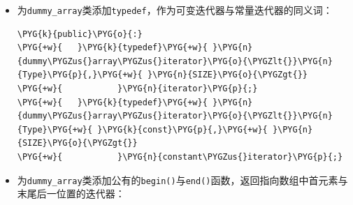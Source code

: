 \begin{itemize}
\begin{codeblockbg}
\begin{Verbatim}[commandchars=\\\{\},breaklines=true,breakanywhere=true,fontsize=\codefont,xleftmargin=17bp]
\PYG{p}{\PYGZob{}}
\PYG{+w}{  }\PYG{k}{return}\PYG{+w}{ }\PYG{p}{(}\PYG{o}{*}\PYG{p}{(}\PYG{o}{*}\PYG{k}{this}\PYG{+w}{ }\PYG{o}{+}\PYG{+w}{ }\PYG{n}{offset}\PYG{p}{)}\PYG{p}{)}\PYG{p}{;}
\PYG{p}{\PYGZcb{}}
\PYG{n}{value\PYGZus{}type}\PYG{+w}{ }\PYG{k}{const}\PYG{+w}{ }\PYG{o}{\PYGZam{}}\PYG{+w}{ }\PYG{k}{operator}\PYG{p}{[}\PYG{p}{]}\PYG{p}{(}\PYG{n}{difference\PYGZus{}type}\PYG{+w}{ }\PYG{k}{const}\PYG{+w}{ }\PYG{n}{offset}\PYG{p}{)}\PYG{+w}{ }\PYG{k}{const}
\PYG{p}{\PYGZob{}}
\PYG{+w}{  }\PYG{k}{return}\PYG{+w}{ }\PYG{p}{(}\PYG{o}{*}\PYG{p}{(}\PYG{o}{*}\PYG{k}{this}\PYG{+w}{ }\PYG{o}{+}\PYG{+w}{ }\PYG{n}{offset}\PYG{p}{)}\PYG{p}{)}\PYG{p}{;}
\PYG{p}{\PYGZcb{}}
\end{Verbatim}
\end{codeblockbg}



\item 为\texttt{dummy\_\allowbreak{}array}类添加\texttt{typedef}，作为可变迭代器与常量迭代器的同义词：



\begin{codeblockbg}
\begin{Verbatim}[commandchars=\\\{\},breaklines=true,breakanywhere=true,fontsize=\codefont,xleftmargin=17bp]
\PYG{k}{public}\PYG{o}{:}
\PYG{+w}{   }\PYG{k}{typedef}\PYG{+w}{ }\PYG{n}{dummy\PYGZus{}array\PYGZus{}iterator}\PYG{o}{\PYGZlt{}}\PYG{n}{Type}\PYG{p}{,}\PYG{+w}{ }\PYG{n}{SIZE}\PYG{o}{\PYGZgt{}}
\PYG{+w}{           }\PYG{n}{iterator}\PYG{p}{;}
\PYG{+w}{   }\PYG{k}{typedef}\PYG{+w}{ }\PYG{n}{dummy\PYGZus{}array\PYGZus{}iterator}\PYG{o}{\PYGZlt{}}\PYG{n}{Type}\PYG{+w}{ }\PYG{k}{const}\PYG{p}{,}\PYG{+w}{ }\PYG{n}{SIZE}\PYG{o}{\PYGZgt{}}
\PYG{+w}{           }\PYG{n}{constant\PYGZus{}iterator}\PYG{p}{;}
\end{Verbatim}
\end{codeblockbg}



\item 为\texttt{dummy\_\allowbreak{}array}类添加公有的\texttt{begin()}与\texttt{end()}函数，返回指向数组中首元素与末尾后一位置的迭代器：




\end{itemize}
